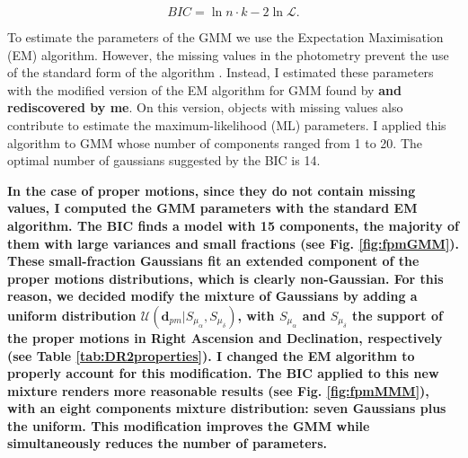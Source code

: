 \begin{equation}
\label{eq:BIC}
BIC = \ln{n}\cdot k - 2 \ln{\mathcal{L}}.
\end{equation}

To estimate the parameters of the GMM we use the Expectation Maximisation (EM) algorithm. However, the missing values in the photometry prevent the use of the standard form of the algorithm \cite[see for example Chapter 9 of][]{Bishop2006}.
Instead, I estimated these parameters with the modified version of the EM algorithm for GMM found by \citet{McMichael1996} \textbf{and rediscovered by me}. On this version, objects with missing values also contribute to estimate the maximum-likelihood (ML) parameters. I applied this algorithm to GMM whose number of components ranged from 1 to 20. The optimal number of gaussians suggested by the BIC is 14. 

\textbf{In the case of proper motions, since they do not contain missing values, I computed the GMM parameters with the standard EM algorithm. The BIC finds a model with 15 components, the majority of them with large variances and small fractions (see Fig. \ref{fig:fpmGMM}). These small-fraction Gaussians fit an extended component of the proper motions distributions, which is clearly non-Gaussian. For this reason, we decided modify the mixture of Gaussians by adding a uniform distribution $\mathcal{U}(\textbf{d}_{pm}|S_{\mu_{\alpha}},S_{\mu_{\delta}})$, with $S_{\mu_{\alpha}}$ and $S_{\mu_{\delta}}$ the support of the proper motions in Right Ascension and Declination, respectively (see Table \ref{tab:DR2properties}). I changed the EM algorithm to properly account for this modification. The BIC applied to this new mixture renders more reasonable results (see Fig. \ref{fig:fpmMMM}), with an eight components mixture distribution: seven Gaussians plus the uniform. This modification improves the GMM while simultaneously reduces the number of parameters.}

